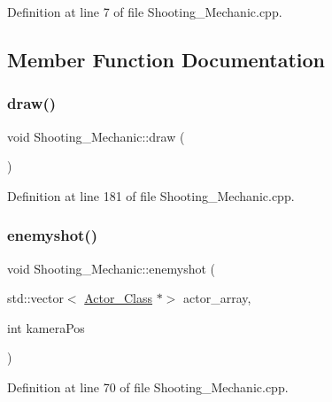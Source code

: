 Definition at line 7 of file Shooting\+\_\+\+Mechanic.\+cpp.



\subsection{Member Function Documentation}
\hypertarget{class_shooting___mechanic_a563bb47b2bb1c5f141cf47579d1402a6}{}\label{class_shooting___mechanic_a563bb47b2bb1c5f141cf47579d1402a6} 
\subsubsection{\texorpdfstring{draw()}{draw()}}
{\footnotesize\ttfamily void Shooting\+\_\+\+Mechanic\+::draw (\begin{DoxyParamCaption}{ }\end{DoxyParamCaption})}



Definition at line 181 of file Shooting\+\_\+\+Mechanic.\+cpp.

\hypertarget{class_shooting___mechanic_a2589f160241b7703aa04a3e2ffb11a9a}{}\label{class_shooting___mechanic_a2589f160241b7703aa04a3e2ffb11a9a} 
\subsubsection{\texorpdfstring{enemyshot()}{enemyshot()}}
{\footnotesize\ttfamily void Shooting\+\_\+\+Mechanic\+::enemyshot (\begin{DoxyParamCaption}\item[{std\+::vector$<$ \hyperlink{class_actor___class}{Actor\+\_\+\+Class} $\ast$$>$}]{actor\+\_\+array,  }\item[{int}]{kamera\+Pos }\end{DoxyParamCaption})}



Definition at line 70 of file Shooting\+\_\+\+Mechanic.\+cpp.

\hypertarget{class_shooting___mechanic_ae400341fd136cbd1ba39e5bcef2d6537}{}\label{class_shooting___mechanic_ae400341fd136cbd1ba39e5bcef2d6537} 
